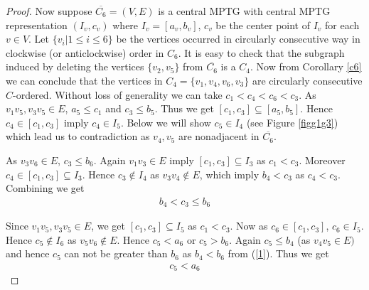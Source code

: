 \documentclass{article}
\theoremstyle{definition}
\numberwithin{equation}{section}
\begin{document}
\begin{proof}
\vspace*{.2 em}

\noindent Now suppose $\overline{C_{6}}=(V,E)$ is a central MPTG with central MPTG representation $(I_{v},c_{v})$ where $I_{v}=[a_{v},b_{v}]$, $c_{v}$ be the center point of $I_{v}$ for each $v\in V$. Let $\{v_{i}|1\leq i \leq 6\}$ be the vertices occurred in circularly consecutive way in clockwise (or anticlockwise) order in $C_{6}$. It is easy to check that the subgraph induced by deleting the vertices $\{v_{2},v_{5}\}$ from $\overline{C_{6}}$ is a $C_{4}$. Now from  Corollary \ref{c6} we can conclude that the vertices in $C_{4}=\{v_{1},v_{4},v_{6},v_{3}\}$ are circularly consecutive $C$-ordered. Without loss of generality we can take $c_{1}<c_{4}<c_{6}<c_{3}$.
As $v_{1}v_{5},v_{3}v_{5}\in E$, $a_{5}\leq c_{1}$ and $c_{3}\leq b_{5}$.
Thus we get $[c_{1},c_{3}]\subseteq [a_{5},b_{5}]$. Hence
$c_{4}\in [c_{1},c_{3}]$ imply $c_{4}\in I_{5}$. Below we will show $c_{5}\in I_{4}$ (see Figure \ref{figg1g3}) which lead us to contradiction as $v_{4},v_{5}$ are nonadjacent in $\overline{C_{6}}$. 

\vspace*{.2 em}
\noindent 
 As $v_{3}v_{6}\in E$, $c_{3}\leq b_{6}$. Again $v_{1}v_{3}\in E$ imply 
$[c_{1},c_{3}]\subseteq I_{3}$ as $c_{1}<c_{3}$. Moreover $c_{4} \in [c_{1},c_{3}]\subseteq I_{3}$. Hence $c_{3}\notin I_{4}$ as $v_{3}v_{4}\notin E$,  which imply $b_{4}<c_{3}$ as $c_{4}<c_{3}$. Combining we get 
\begin{eqnarray}\label{1}
b_{4}<c_{3}\leq b_{6} 
\end{eqnarray}

\vspace*{.1 em}
\noindent 
Since $v_{1}v_{5}, v_{3}v_{5}\in E$, we get $[c_{1},c_{3}]\subseteq I_{5}$ as $c_{1}<c_{3}$. Now as $c_{6}\in[c_{1},c_{3}]$, $c_{6}\in I_{5}$. Hence  $c_{5}\notin I_{6}$ as $v_{5}v_{6}\notin E$. Hence $c_{5}<a_{6}$ or $c_{5}>b_{6}$. Again $c_{5}\leq b_{4}$ (as $v_{4}v_{5}\in E)$ and hence $c_{5}$ can not be greater than $b_{6}$ as $b_{4}<b_{6}$ from (\ref{1}). Thus we get 
\begin{eqnarray}\label{2}
c_{5}<a_{6}
\end{eqnarray}


\end{proof}
\end{document}
